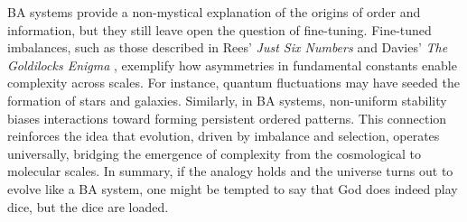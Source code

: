 \documentclass[entropy,article,submit,pdftex,moreauthors]{Definitions/mdpi}
\begin{document}
BA systems provide a non-mystical explanation of the origins of order and information, but they still leave open the question of fine-tuning. Fine-tuned imbalances, such as those described in Rees' \textit{Just Six Numbers} \cite{rees2000just} and Davies' \textit{The Goldilocks Enigma} \cite{davies2006goldilocks}, exemplify how asymmetries in fundamental constants enable complexity across scales. For instance, quantum fluctuations may have seeded the formation of stars and galaxies. Similarly, in BA systems,  non-uniform stability biases interactions toward forming persistent ordered patterns. This connection reinforces the idea that evolution, driven by imbalance and selection, operates universally, bridging the emergence of complexity from the cosmological to molecular scales. In summary, if the analogy holds and the universe turns out to evolve like a BA system, one might be tempted to say that God does indeed play dice, but the dice are loaded.



\vspace{6pt} 



\end{document}

